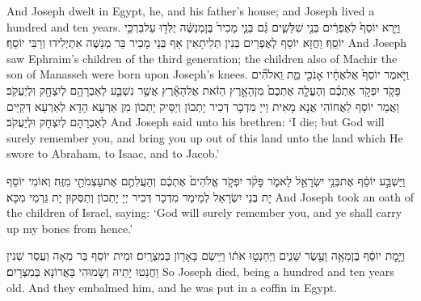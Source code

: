 {And Joseph dwelt in Egypt, he, and his father’s house; and Joseph lived a hundred and ten years.}{}
{וַיַּ֤רְא יוֹסֵף֙ לְאֶפְרַ֔יִם בְּנֵ֖י שִׁלֵּשִׁ֑ים גַּ֗ם בְּנֵ֤י מָכִיר֙ בֶּן\maqqaf מְנַשֶּׁ֔ה יֻלְּד֖וּ עַל\maqqaf בִּרְכֵּ֥י יוֹסֵֽף׃}
{וַחֲזָא יוֹסֵף לְאֶפְרַיִם בְּנִין תְּלִיתָאִין אַף בְּנֵי מָכִיר בַּר מְנַשֶּׁה אִתְיְלִידוּ וְרַבִּי יוֹסֵף׃}
{And Joseph saw Ephraim’s children of the third generation; the children also of Machir the son of Manasseh were born upon Joseph’s knees.}{}
{וַיֹּ֤אמֶר יוֹסֵף֙ אֶל\maqqaf אֶחָ֔יו אָנֹכִ֖י מֵ֑ת וֵֽאלֹהִ֞ים פָּקֹ֧ד יִפְקֹ֣ד אֶתְכֶ֗ם וְהֶעֱלָ֤ה אֶתְכֶם֙ מִן\maqqaf הָאָ֣רֶץ הַזֹּ֔את אֶל\maqqaf הָאָ֕רֶץ אֲשֶׁ֥ר נִשְׁבַּ֛ע לְאַבְרָהָ֥ם לְיִצְחָ֖ק וּֽלְיַעֲקֹֽב׃}
{וַאֲמַר יוֹסֵף לַאֲחוֹהִי אֲנָא מָאִית וַייָ מִדְכָר דְּכִיר יָתְכוֹן וְיַסֵּיק יָתְכוֹן מִן אַרְעָא הָדָא לְאַרְעָא דְּקַיֵּים לְאַבְרָהָם לְיִצְחָק וּלְיַעֲקֹב׃}
{And Joseph said unto his brethren: ‘I die; but God will surely remember you, and bring you up out of this land unto the land which He swore to Abraham, to Isaac, and to Jacob.’}{}

{וַיַּשְׁבַּ֣ע יוֹסֵ֔ף אֶת\maqqaf בְּנֵ֥י יִשְׂרָאֵ֖ל לֵאמֹ֑ר פָּקֹ֨ד יִפְקֹ֤ד אֱלֹהִים֙ אֶתְכֶ֔ם וְהַעֲלִתֶ֥ם אֶת\maqqaf עַצְמֹתַ֖י מִזֶּֽה׃}
{וְאוֹמִי יוֹסֵף יָת בְּנֵי יִשְׂרָאֵל לְמֵימַר מִדְכָר דְּכִיר יְיָ יָתְכוֹן וְתַסְּקוּן יָת גַּרְמַי מִכָּא׃}
{And Joseph took an oath of the children of Israel, saying: ‘God will surely remember you, and ye shall carry up my bones from hence.’}{}

{וַיָּ֣מׇת יוֹסֵ֔ף בֶּן\maqqaf מֵאָ֥ה וָעֶ֖שֶׂר שָׁנִ֑ים וַיַּחַנְט֣וּ אֹת֔וֹ וַיִּ֥ישֶׂם בָּאָר֖וֹן בְּמִצְרָֽיִם׃}
{וּמִית יוֹסֵף בַּר מְאָה וַעֲסַר שְׁנִין וַחֲנַטוּ יָתֵיהּ וְשָׂמוּהִי בַּאֲרוֹנָא בְּמִצְרָיִם׃}
{So Joseph died, being a hundred and ten years old. And they embalmed him, and he was put in a coffin in Egypt.}{}

\newperek
